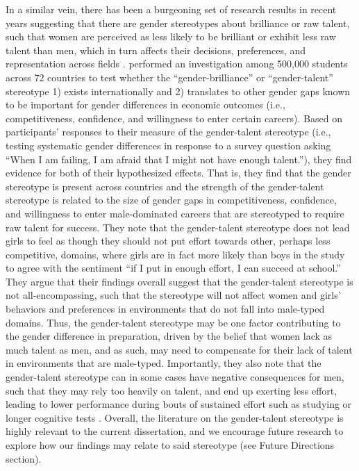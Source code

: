 \documentclass[letterpaper, nobind]{templates/ociamthesis}
\begin{document}
In a similar vein, there has been a burgeoning set of research results in recent years suggesting that there are gender stereotypes about brilliance or raw talent, such that women are perceived as less likely to be brilliant or exhibit less raw talent than men, which in turn affects their decisions, preferences, and representation across fields \autocite{Bian2017,Bian2017a,Leslie2015,Meyer2015,Bian2018,Storage2020}. \textcite{Napp2022} performed an investigation among 500,000 students across 72 countries to test whether the ``gender-brilliance'' or ``gender-talent'' stereotype 1) exists internationally and 2) translates to other gender gaps known to be important for gender differences in economic outcomes (i.e., competitiveness, confidence, and willingness to enter certain careers). Based on participants' responses to their measure of the gender-talent stereotype (i.e., testing systematic gender differences in response to a survey question asking ``When I am failing, I am afraid that I might not have enough talent.''), they find evidence for both of their hypothesized effects. That is, they find that the gender stereotype is present across countries and the strength of the gender-talent stereotype is related to the size of gender gaps in competitiveness, confidence, and willingness to enter male-dominated careers that are stereotyped to require raw talent for success. They note that the gender-talent stereotype does not lead girls to feel as though they should not put effort towards other, perhaps less competitive, domains, where girls are in fact more likely than boys in the study to agree with the sentiment ``if I put in enough effort, I can succeed at school.'' They argue that their findings overall suggest that the gender-talent stereotype is not all-encompassing, such that the stereotype will not affect women and girls' behaviors and preferences in environments that do not fall into male-typed domains. Thus, the gender-talent stereotype may be one factor contributing to the gender difference in preparation, driven by the belief that women lack as much talent as men, and as such, may need to compensate for their lack of talent in environments that are male-typed. Importantly, they also note that the gender-talent stereotype can in some cases have negative consequences for men, such that they may rely too heavily on talent, and end up exerting less effort, leading to lower performance during bouts of sustained effort such as studying or longer cognitive tests \autocite{Balart2019}. Overall, the literature on the gender-talent stereotype is highly relevant to the current dissertation, and we encourage future research to explore how our findings may relate to said stereotype (see Future Directions section).
\end{document}
